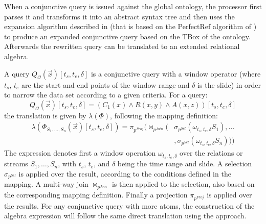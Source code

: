 When a conjunctive query is issued against the global ontology, the processor first parses it and transforms it into an abstract syntax tree and then uses the expansion algorithm described in \cite{Barrasa_04} (that is based on the \textsf{PerfectRef} algorithm of \cite{Calvanese_05}) to produce an expanded conjunctive query based on the TBox of the ontology. 
Afterwards the rewritten query can be translated to an extended relational algebra.

A query $Q_{\mathcal{O}}(\vec{x})[t_s,t_e,\delta]$ is a conjunctive query with a window operator (where $t_s$, $t_e$ are the start and end points of the window range and $\delta$ is the slide) in order to narrow the data set according to a given criteria. 
For a query:
\begin{equation*}
  Q_{\mathcal{O}}(\vec{x})[t_s,t_e,\delta] = (C_1(x) \wedge R(x,y) \wedge A(x,z)) [t_s,t_e,\delta]
\end{equation*}
the translation is given by $\lambda(\Phi)$, following the mapping definition:
\begin{align*}
\lambda(\Phi_{S_1,\ldots,S_n}(\vec{x}) {\scriptstyle [t_s,t_e,\delta]}
)=\pi_{p^{Proj}}(\Join_{p^{Join}}
(&\sigma_{p^{Sel}}(\omega_{t_s,t_e,\delta}S_1),\dots \\ &,\sigma_{p^{Sel}}(\omega_{t_s,t_e,\delta}S_n)))
\end{align*}
The expression denotes first a window operation $\omega_{t_s,t_e,\delta}$ over the relations or streams $S_1,\dots, S_n$, with $t_s$, $t_e$, and $\delta$ being the time range and slide. 
A selection $\sigma_{p^{Sel}}$ is applied over the result, according to the conditions defined in the mapping. 
A multi-way join $\Join_{p^{Join}}$ is then applied to the selection, also based on the corresponding mapping definition. 
Finally a projection $\pi_{p^{Proj}}$ is applied over the results. 
For any conjunctive query with more atoms, the construction of the algebra expression will follow the same direct translation using the \gav approach.
%
